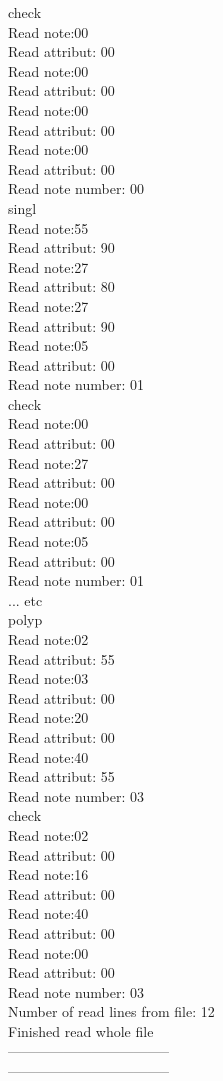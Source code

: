 check\\
Read note:00\\
Read attribut: 00\\
Read note:00\\
Read attribut: 00\\
Read note:00\\
Read attribut: 00\\
Read note:00\\
Read attribut: 00\\
Read note number: 00\\

singl\\
Read note:55\\
Read attribut: 90\\
Read note:27\\
Read attribut: 80\\
Read note:27\\
Read attribut: 90\\
Read note:05\\
Read attribut: 00\\
Read note number: 01\\

check\\
Read note:00\\
Read attribut: 00\\
Read note:27\\
Read attribut: 00\\
Read note:00\\
Read attribut: 00\\
Read note:05\\
Read attribut: 00\\
Read note number: 01\\

... etc \\

polyp\\
Read note:02\\
Read attribut: 55\\
Read note:03\\
Read attribut: 00\\
Read note:20\\
Read attribut: 00\\
Read note:40\\
Read attribut: 55\\
Read note number: 03\\

check\\
Read note:02\\
Read attribut: 00\\
Read note:16\\
Read attribut: 00\\
Read note:40\\
Read attribut: 00\\
Read note:00\\
Read attribut: 00\\
Read note number: 03\\

Number of read lines from file: 12\\
Finished read whole file\\
-----------------------------------\\
-----------------------------------\\